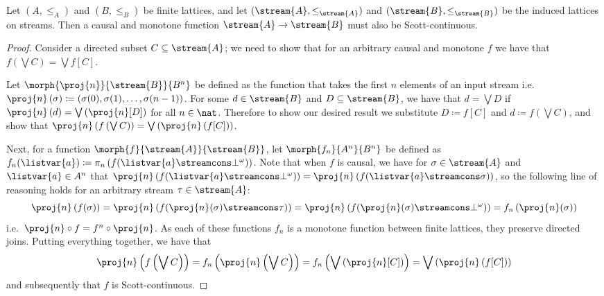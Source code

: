 \documentclass{lmcs}
\begin{document}
\begin{prop}\label{prop:monotone-causal-scott}
    Let \((A, \leq_A)\) and \((B, \leq_B)\) be finite lattices, and let
    \((\stream{A}, \leq_{\stream{A}})\) and \((\stream{B}, \leq_{\stream{B}})\)
    be the induced lattices on streams.
    Then a causal and monotone function \(\stream{A} \to \stream{B}\) must also
    be Scott-continuous.
\end{prop}
\begin{proof}
    Consider a directed subset \(C \subseteq \stream{A}\); we need to show that
    for an arbitrary causal and monotone \(f\) we
    have that \(f\left(\bigvee C\right) = \bigvee f[C]\).

    Let \(\morph{\proj{n}}{\stream{B}}{B^n}\) be defined as the
    function that takes the first \(n\) elements of an input stream i.e.\
    \(
    \proj{n}\left(\sigma\right)
    \coloneqq \left(
    \sigma(0),
    \sigma(1),
    \ldots,
    \sigma(n-1)\right)\).
    For some \(d \in \stream{B}\) and \(D \subseteq \stream{B}\), we have that
    \(d = \bigvee D\) if \(
    \proj{n}\left(d\right)
    =
    \bigvee\left(\proj{n}[D]\right)
    \) for all \(n \in \nat\).
    Therefore to show our desired result we substitute \(D \coloneqq f[C]\) and
    \(d \coloneqq f\left(\bigvee C\right)\), and show that \(
    \proj{n}\left(f\left(\bigvee C\right)\right)
    =
    \bigvee\left(\proj{n}\left(f[C]\right)\right)
    \).

    Next, for a function \(\morph{f}{\stream{A}}{\stream{B}}\), let
    \(\morph{f_n}{A^n}{B^n}\) be defined as \(
    f_n(\listvar{a})
    \coloneqq
    \pi_n\left(f(\listvar{a} \streamcons \bot^\omega)\right)
    \).
    Note that when \(f\) is causal, we have for \(
    \sigma \in \stream{A}
    \) and \(
    \listvar{a} \in A^n
    \) that \(
    \proj{n}\left(f(\listvar{a} \streamcons \bot^\omega)\right)
    =
    \proj{n}\left(f(\listvar{a} \streamcons \sigma)\right)
    \), so the following line of reasoning holds for an arbitrary stream
    \(\tau \in \stream{A}\):
    \[
        \proj{n}\left(f(\sigma)\right)
        =
        \proj{n}\left(f(\proj{n}(\sigma) \streamcons \tau)\right)
        =
        \proj{n}\left(f(\proj{n}(\sigma) \streamcons \bot^\omega)\right)
        =
        f_n\left(\proj{n}(\sigma)\right)
    \]
    i.e.\ \(\proj{n} \circ f = f^n \circ \proj{n}\).
    As each of these functions \(f_n\) is a monotone function between finite
    lattices, they preserve directed joins.
    Putting everything together, we have that
    \[
        \proj{n}\left(f\left(\bigvee C\right)\right)
        =
        f_n\left(\proj{n}\left(\bigvee C\right)\right)
        =
        f_n\left(\bigvee \left(\proj{n}[C]\right)\right)
        =
        \bigvee \left(\proj{n}\left(f[C]\right)\right)
    \]
    and subsequently that \(f\) is Scott-continuous.
\end{proof}
\end{document}

